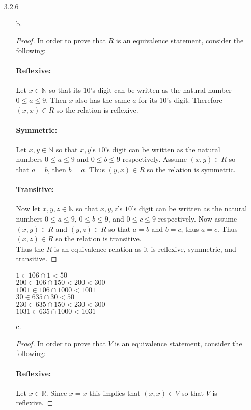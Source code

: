 \documentclass[11pt]{amsart}
\theoremstyle{definition}
\begin{document}
\begin{itemize}
\item[3.2.6]
\begin{itemize}
    \item[b.]
    \begin{proof}
        In order to prove that $R$ is an equivalence statement, consider the following:
        \paragraph{Reflexive:}
            Let $x\in\mathbb{N}$ so that its $10$'s digit can be written as the natural number $0\le a\le 9$. Then $x$ also has the same $a$ for its $10$'s digit. Therefore $(x,x)\in R$ so the relation is reflexive.
        \paragraph{Symmetric:}
            Let $x,y\in\mathbb{N}$ so that $x,y$'s $10$'s digit can be written as the natural numbers $0\le a\le 9$ and $0\le b\le 9$ respectively. Assume $(x,y)\in R$ so that $a=b$, then $b=a$. Thus $(y,x)\in R$ so the relation is symmetric.
        \paragraph{Transitive:}
            Now let $x,y,z\in\mathbb{N}$ so that $x,y,z$'s $10$'s digit can be written as the natural numbers $0\le a\le 9$, $0\le b\le 9$, and $0\le c\le 9$ respectively. Now assume $(x,y)\in R$ and $(y,z)\in R$ so that $a=b$ and $b=c$, thus $a=c$. Thus $(x,z)\in R$ so the relation is transitive. \\
        Thus the $R$ is an equivalence relation as it is reflexive, symmetric, and transitive.
    \end{proof}
    $1\in\bar{106}\cap 1<50$ \\
    $200\in\bar{106}\cap 150<200<300$ \\
    $1001\in\bar{106}\cap 1000<1001$ \\
    $30\in\bar{635}\cap 30<50$ \\
    $230\in\bar{635}\cap 150<230<300$ \\
    $1031\in\bar{635}\cap 1000<1031$
        
    \item[c.]
    \begin{proof}
        In order to prove that $V$ is an equivalence statement, consider the following:
        \paragraph{Reflexive:}
            Let $x\in\mathbb{R}$. Since $x=x$ this implies that $(x,x)\in V$ so that $V$ is reflexive.

\end{proof}
\end{itemize}
\end{itemize}
\end{document}

